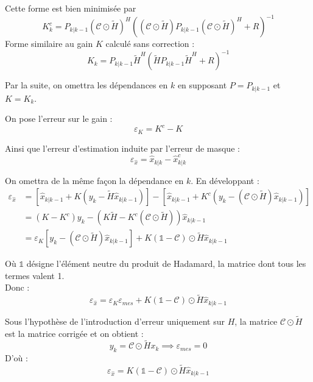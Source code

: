 \documentclass[titlepage]{article}
\newcommand{\C}{\mathcal{C}}
\newcommand{\Ht}{\widetilde{H}}
\newcommand{\Hc}{\C\odot\Ht}
\begin{document}
	Cette forme est bien minimisée par 
	\begin{equation}
		K_k^c = P_{k|k-1}\left(\Hc\right)^H\left(\left(\Hc\right)P_{k|k-1}\left(\Hc\right)^H + R\right)^{-1}
	\end{equation}
	Forme similaire au gain $K$ calculé sans correction :
	\begin{equation}
		K_k = P_{k|k-1}\Ht^H\left(\Ht P_{k|k-1}\Ht^H + R\right)^{-1}
	\end{equation}

	Par la suite, on omettra les dépendances en $k$ en supposant $P=P_{k|k-1}$ et $K = K_k$.
	
	On pose l'erreur sur le gain :
	\begin{equation}
		\varepsilon_K = K^c - K
	\end{equation}

	Ainsi que l'erreur d'estimation induite par l'erreur de masque :
	\begin{equation}
		\varepsilon_{\widehat{x}} = \widehat{x}_{k|k} - \widehat{x}_{k|k}^c
	\end{equation}
	
	On omettra de la même façon la dépendance en $k$. En développant :
	\begin{align*}
		\varepsilon_{\widehat{x}} &= \left[\widehat{x}_{k|k-1} + K(y_k-\Ht\widehat{x}_{k|k-1})\right] - \left[\widehat{x}_{k|k-1} + K^c\left(y_k - \left(\Hc\right)\widehat{x}_{k|k-1}\right)\right] \\
		&= \left(K-K^c\right)y_k - \left(K\Ht - K^c(\Hc)\right)\widehat{x}_{k|k-1} \\
		&= \varepsilon_K\left[y_k - \left(\Hc\right)\widehat{x}_{k|k-1}\right] + K\left(\mathbb{1}-\C\right)\odot\Ht\widehat{x}_{k|k-1}
	\end{align*}

	Où $\mathbb{1}$ désigne l'élément neutre du produit de Hadamard, la matrice dont tous les termes valent 1.\\	
	Donc :
	\begin{equation}
		\varepsilon_{\widehat{x}} = \varepsilon_K\varepsilon_{mes} + K\left(\mathbb{1} - \mathcal{C}\right)\odot\Ht\widehat{x}_{k|k-1}
	\end{equation}

	Sous l'hypothèse de l'introduction d'erreur uniquement sur $H$, la matrice $\C\odot\Ht$ est la matrice corrigée et on obtient :
	$$
		y_k = \Hc x_k \implies \varepsilon_{mes} = 0
	$$
	D'où :
	\begin{equation}
		\varepsilon_{\widehat{x}} = K \left(\mathbb{1} - \C\right)\odot\Ht\widehat{x}_{k|k-1}
	\end{equation}
\end{document}
